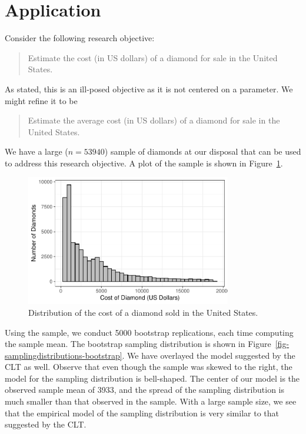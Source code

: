 \documentclass[
  letterpaper,
  DIV=11,
  numbers=noendperiod]{scrreprt}
\theoremstyle{definition}
\theoremstyle{definition}
\theoremstyle{plain}
\theoremstyle{remark}
\begin{document}
\hypertarget{application}{%
\section{Application}\label{application}}

Consider the following research objective:

\begin{quote}
Estimate the cost (in US dollars) of a diamond for sale in the United
States.
\end{quote}

As stated, this is an ill-posed objective as it is not centered on a
parameter. We might refine it to be

\begin{quote}
Estimate the average cost (in US dollars) of a diamond for sale in the
United States.
\end{quote}

We have a large (\(n = 53940\)) sample of diamonds at our disposal that
can be used to address this research objective. A plot of the sample is
shown in Figure~\ref{fig-samplingdistributions-sample}.

\begin{figure}

{\centering \includegraphics[width=0.8\textwidth,height=\textheight]{./images/fig-samplingdistributions-sample-1.pdf}

}

\caption{\label{fig-samplingdistributions-sample}Distribution of the
cost of a diamond sold in the United States.}

\end{figure}

Using the sample, we conduct 5000 bootstrap replications, each time
computing the sample mean. The bootstrap sampling distribution is shown
in Figure~\ref{fig-samplingdistributions-bootstrap}. We have overlayed
the model suggested by the CLT as well. Observe that even though the
sample was skewed to the right, the model for the sampling distribution
is bell-shaped. The center of our model is the observed sample mean of
3933, and the spread of the sampling distribution is much smaller than
that observed in the sample. With a large sample size, we see that the
empirical model of the sampling distribution is very similar to that
suggested by the CLT.
\end{document}
